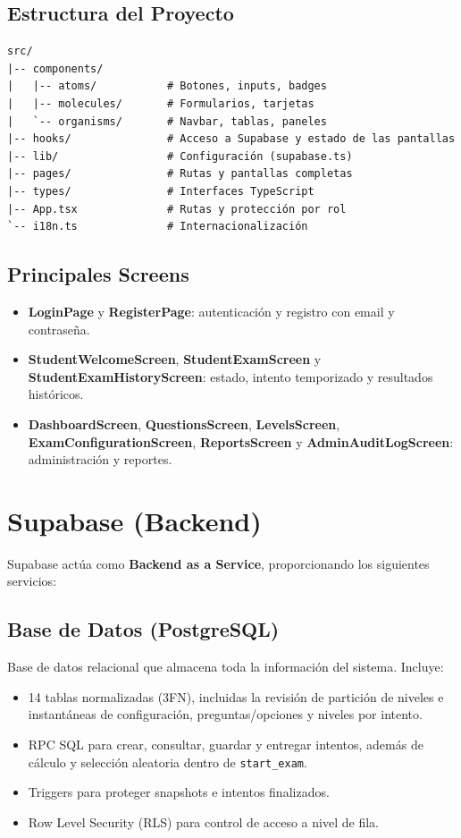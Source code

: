 \subsection{Estructura del Proyecto}

\begin{verbatim}
src/
|-- components/
|   |-- atoms/           # Botones, inputs, badges
|   |-- molecules/       # Formularios, tarjetas
|   `-- organisms/       # Navbar, tablas, paneles
|-- hooks/               # Acceso a Supabase y estado de las pantallas
|-- lib/                 # Configuración (supabase.ts)
|-- pages/               # Rutas y pantallas completas
|-- types/               # Interfaces TypeScript
|-- App.tsx              # Rutas y protección por rol
`-- i18n.ts              # Internacionalización
\end{verbatim}

\subsection{Principales Screens}

\begin{itemize}
    \item \textbf{LoginPage} y \textbf{RegisterPage}: autenticación y registro con email y contraseña.
    \item \textbf{StudentWelcomeScreen}, \textbf{StudentExamScreen} y \textbf{StudentExamHistoryScreen}: estado, intento temporizado y resultados históricos.
    \item \textbf{DashboardScreen}, \textbf{QuestionsScreen}, \textbf{LevelsScreen}, \textbf{ExamConfigurationScreen}, \textbf{ReportsScreen} y \textbf{AdminAuditLogScreen}: administración y reportes.
\end{itemize}

\section{Supabase (Backend)}

Supabase actúa como \textbf{Backend as a Service}, proporcionando los siguientes servicios:

\subsection{Base de Datos (PostgreSQL)}

Base de datos relacional que almacena toda la información del sistema. Incluye:

\begin{itemize}
    \item 14 tablas normalizadas (3FN), incluidas la revisión de partición de niveles e instantáneas de configuración, preguntas/opciones y niveles por intento.
    \item RPC SQL para crear, consultar, guardar y entregar intentos, además de cálculo y selección aleatoria dentro de \texttt{start\_exam}.
    \item Triggers para proteger snapshots e intentos finalizados.
    \item Row Level Security (RLS) para control de acceso a nivel de fila.
\end{itemize}

